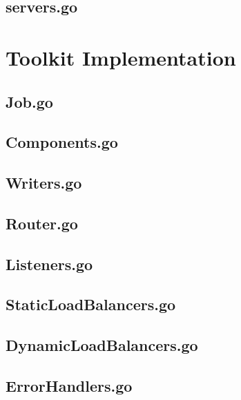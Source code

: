 \begin{appendices}
\subsection{servers.go}


\newpage
\section{Toolkit Implementation}
\subsection{Job.go}


\subsection{Components.go}


\subsection{Writers.go}
\label{sec:writer.go}


\newpage
\subsection{Router.go}
\label{sec:Router.go}


\subsection{Listeners.go}
\label{sec:Listeners.go}


\subsection{StaticLoadBalancers.go}
\label{sec:StaticLoadBalancers.go}


\subsection{DynamicLoadBalancers.go}
\label{sec:DynamicLoadBalancers.go}


\subsection{ErrorHandlers.go}
\label{sec:ErrorHandlers.go}



\end{appendices}
